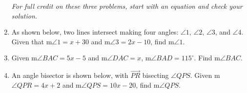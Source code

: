 \begin{enumerate}
\emph{For full credit on these three problems, start with an equation and check your solution.}
\item As shown below, two lines intersect making four angles: $\angle 1$, $\angle 2$, $\angle 3$, and $\angle 4$. Given that m$\angle 1= x+30$ and m$\angle 3=2x-10$, find m$\angle 1$.
  \begin{flushright}
    \end{flushright}

\item Given m$\angle BAC = 5x-5$ and m$\angle DAC = x$, m$\angle BAD=115^\circ$. Find m$\angle BAC$.
  \begin{flushright}
  \end{flushright} \vspace{1cm}

\newpage
\item An angle bisector is shown below, with $\overrightarrow{PR}$ bisecting $\angle QPS$. Given m$\angle QPR = 4x+2$ and m$\angle QPS = 10x-20$, find m$\angle QPS$.
    \begin{flushright}
    \end{flushright}


\end{enumerate}
